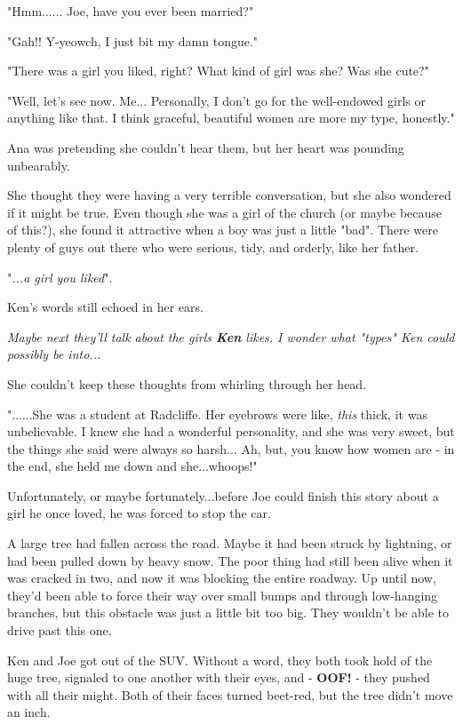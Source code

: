 \documentclass[
]{article}
\begin{document}
"Hmm...... Joe, have you ever been married?"

"Gah!! Y-yeowch, I just bit my damn tongue."

"There was a girl you liked, right? What kind of girl was she? Was she
cute?"

"Well, let's see now. Me... Personally, I don't go for the well-endowed
girls or anything like that. I think graceful, beautiful women are more
my type, honestly."

Ana was pretending she couldn't hear them, but her heart was pounding
unbearably.

She thought they were having a very terrible conversation, but she also
wondered if it might be true. Even though she was a girl of the church
(or maybe because of this?), she found it attractive when a boy was just
a little "bad". There were plenty of guys out there who were serious,
tidy, and orderly, like her father.

"\emph{...a girl you liked}".

Ken's words still echoed in her ears.

\emph{Maybe next they'll talk about the girls \textbf{Ken} likes. I
wonder what "types" Ken could possibly be into...}

She couldn't keep these thoughts from whirling through her head.

"......She was a student at Radcliffe. Her eyebrows were like,
\emph{this} thick, it was unbelievable. I knew she had a wonderful
personality, and she was very sweet, but the things she said were always
so harsh... Ah, but, you know how women are - in the end, she held me
down and she...whoops!"

Unfortunately, or maybe fortunately...before Joe could finish this story
about a girl he once loved, he was forced to stop the car.

A large tree had fallen across the road. Maybe it had been struck by
lightning, or had been pulled down by heavy snow. The poor thing had
still been alive when it was cracked in two, and now it was blocking the
entire roadway. Up until now, they'd been able to force their way over
small bumps and through low-hanging branches, but this obstacle was just
a little bit too big. They wouldn't be able to drive past this one.

Ken and Joe got out of the SUV. Without a word, they both took hold of
the huge tree, signaled to one another with their eyes, and -
\textbf{OOF!} - they pushed with all their might. Both of their faces
turned beet-red, but the tree didn't move an inch.
\end{document}
